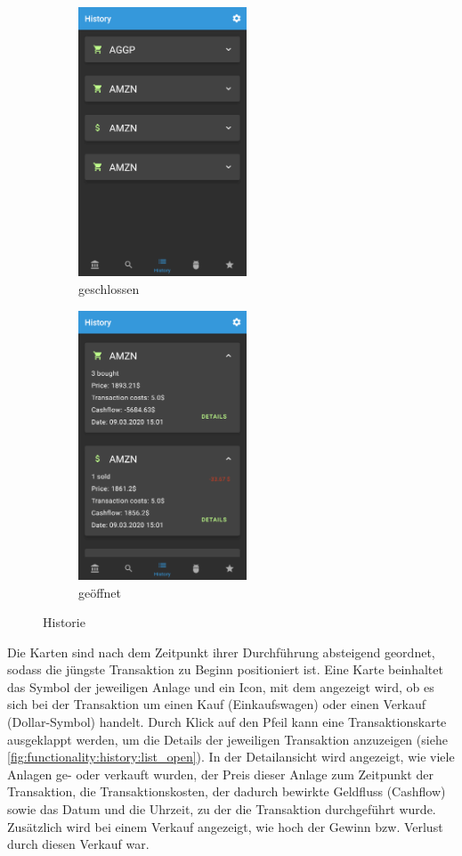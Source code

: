 \documentclass[a4paper]{article}
\begin{document}
\begin{figure}[H]
	\centering
    \begin{subfigure}{.49\textwidth}
        \centering
        \includegraphics[height=8cm,keepaspectratio]{./images/history_list.png}
        \caption{geschlossen}
        \label{fig:functionality:history:list_closed}
    \end{subfigure}
    \begin{subfigure}{.49\textwidth}
        \centering
        \includegraphics[height=8cm,keepaspectratio]{./images/history_list_open.png}
        \caption{geöffnet}
        \label{fig:functionality:history:list_open}
    \end{subfigure}
	\caption{Historie}
	\label{fig:functionality:history:list}
\end{figure}

Die Karten sind nach dem Zeitpunkt ihrer Durchführung absteigend geordnet, sodass die jüngste Transaktion zu Beginn positioniert ist. Eine Karte beinhaltet das Symbol der jeweiligen Anlage und ein Icon, mit dem angezeigt wird, ob es sich bei der Transaktion um einen Kauf (Einkaufswagen) oder einen Verkauf (Dollar-Symbol) handelt. Durch Klick auf den Pfeil kann eine Transaktionskarte ausgeklappt werden, um die Details der jeweiligen Transaktion anzuzeigen (siehe \autoref{fig:functionality:history:list_open}). In der Detailansicht wird angezeigt, wie viele Anlagen ge- oder verkauft wurden, der Preis dieser Anlage zum Zeitpunkt der Transaktion, die Transaktionskosten, der dadurch bewirkte Geldfluss (Cashflow) sowie das Datum und die Uhrzeit, zu der die Transaktion durchgeführt wurde. Zusätzlich wird bei einem Verkauf angezeigt, wie hoch der Gewinn bzw. Verlust durch diesen Verkauf war.
\end{document}
